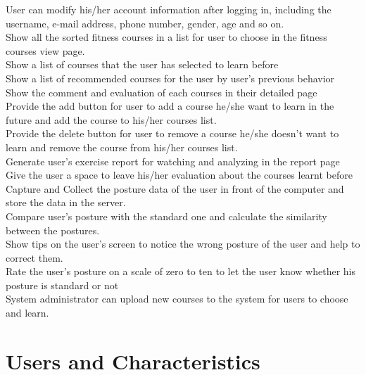 \documentclass[16pt]{scrreprt}
\begin{document}
 
User can modify his/her account information after logging in, including the username, e-mail address, phone number, gender, age and so on.\\

 
Show all the sorted fitness courses in a list for user to choose in the fitness courses view page. \\

 
Show a list of courses that the user has selected to learn before\\

 
Show a list of recommended courses for the user by user's previous behavior \\

 
Show the comment and evaluation of each courses in their detailed page\\

 
Provide the add button for user to add a course he/she want to learn in the future and add the course to his/her courses list.\\

 
Provide the delete button for user to remove a course he/she doesn't want to learn and remove the course from his/her courses list.\\


Generate user's exercise report for watching and analyzing in the report page\\
 
Give the user a space to leave his/her evaluation about the courses learnt before\\

Capture and Collect the posture data of the user in front of the computer and store the data in the server.\\


Compare user's posture with the standard one and calculate the similarity between the postures.\\


Show tips on the user's screen to notice the wrong posture of the user and help to correct them.\\


Rate the user's posture on a scale of zero to ten to let the user know whether his posture is standard or not\\


System administrator can upload new courses to the system for users to choose and learn.\\

\section{Users and Characteristics}
\end{document}

